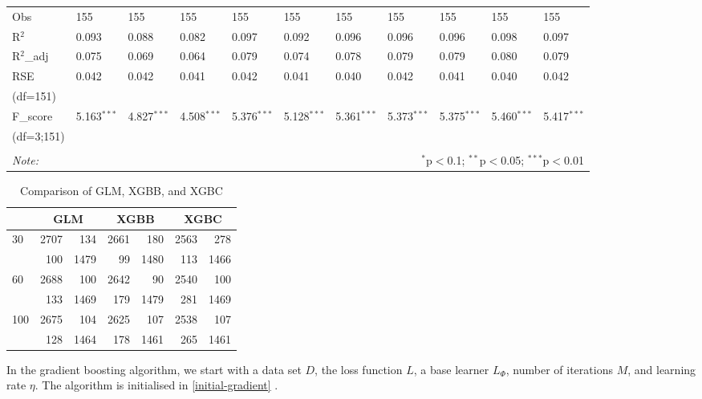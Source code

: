 \begin{table}[H]
\begin{tabularx}{\textwidth}{XXXXXXXXXXl}
Obs & 155 & 155 & 155 & 155 & 155 & 155 & 155 & 155 & 155 & 155 \\ 
R$^{2}$ & 0.093 & 0.088 & 0.082 & 0.097 & 0.092 & 0.096 & 0.096 & 0.096 & 0.098 & 0.097 \\ 
R$^{2}$_{adj} & 0.075 & 0.069 & 0.064 & 0.079 & 0.074 & 0.078 & 0.079 & 0.079 & 0.080 & 0.079 \\ 
RSE & 0.042 & 0.042 & 0.041 & 0.042 & 0.041 & 0.040 & 0.042 & 0.041 & 0.040 & 0.042 \\ 
(df=151) & & & & & & & & & & \\
F_{score} & 5.163$^{***}$ & 4.827$^{***}$ & 4.508$^{***}$ & 5.376$^{***}$ & 5.128$^{***}$ & 5.361$^{***}$ & 5.373$^{***}$ & 5.375$^{***}$ & 5.460$^{***}$ & 5.417$^{***}$ \\ 
(df=3;151) & & & & & & & & & & \\
\hline 
\hline \\[-1.8ex] 
\textit{Note:}  & \multicolumn{10}{r}{$^{*}$p$<$0.1; $^{**}$p$<$0.05; $^{***}$p$<$0.01} \\ 
\end{tabularx} 
\end{table}  




\begin{table}[h]
\centering
\begin{tabular}{|l|rr|rr|rr|}
\toprule
& \multicolumn{2}{c|}{GLM} & \multicolumn{2}{c|}{XGBB} & \multicolumn{2}{c|}{XGBC} \\
\midrule
30 & 2707  & 134 & 2661 & 180 & 2563 & 278 \\
   & 100 & 1479 & 99 & 1480 & 113 & 1466 \\
\hline
60 & 2688  & 100 & 2642    & 90 & 2540   & 100 \\
   & 133  & 1469 & 179  & 1479 & 281  & 1469 \\
\hline
100 & 2675   & 104 & 2625   & 107 & 2538   & 107 \\
    & 128  & 1464 & 178  & 1461 & 265  & 1461 \\
\bottomrule
\end{tabular}
\vspace{1em}
\caption{Comparison of GLM, XGBB, and XGBC}
\label{confusion_matrix_result}
\end{table}







In the gradient boosting algorithm, we start with a data set $D$, the loss function $L$, a base learner $L_\Phi$, number of iterations $M$, and learning rate $\eta$. The algorithm is initialised in \autoref{initial-gradient} \parencite{ntnu-thesis-why-does-xgboost-win-every-machine-learning-competition}.

